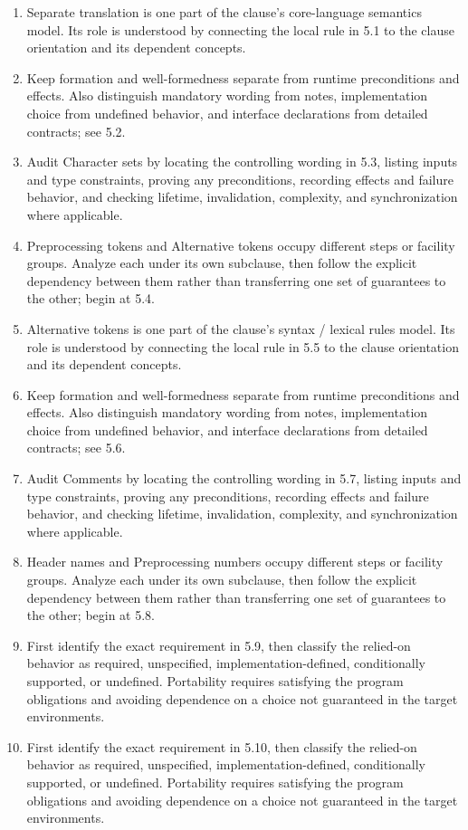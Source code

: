 \documentclass[11pt,letterpaper]{article}
\begin{document}
\begin{enumerate}
\item Separate translation is one part of the clause's core-language semantics model. Its role is understood by connecting the local rule in 5.1 to the clause orientation and its dependent concepts.
\item Keep formation and well-formedness separate from runtime preconditions and effects. Also distinguish mandatory wording from notes, implementation choice from undefined behavior, and interface declarations from detailed contracts; see 5.2.
\item Audit Character sets by locating the controlling wording in 5.3, listing inputs and type constraints, proving any preconditions, recording effects and failure behavior, and checking lifetime, invalidation, complexity, and synchronization where applicable.
\item Preprocessing tokens and Alternative tokens occupy different steps or facility groups. Analyze each under its own subclause, then follow the explicit dependency between them rather than transferring one set of guarantees to the other; begin at 5.4.
\item Alternative tokens is one part of the clause's syntax / lexical rules model. Its role is understood by connecting the local rule in 5.5 to the clause orientation and its dependent concepts.
\item Keep formation and well-formedness separate from runtime preconditions and effects. Also distinguish mandatory wording from notes, implementation choice from undefined behavior, and interface declarations from detailed contracts; see 5.6.
\item Audit Comments by locating the controlling wording in 5.7, listing inputs and type constraints, proving any preconditions, recording effects and failure behavior, and checking lifetime, invalidation, complexity, and synchronization where applicable.
\item Header names and Preprocessing numbers occupy different steps or facility groups. Analyze each under its own subclause, then follow the explicit dependency between them rather than transferring one set of guarantees to the other; begin at 5.8.
\item First identify the exact requirement in 5.9, then classify the relied-on behavior as required, unspecified, implementation-defined, conditionally supported, or undefined. Portability requires satisfying the program obligations and avoiding dependence on a choice not guaranteed in the target environments.
\item First identify the exact requirement in 5.10, then classify the relied-on behavior as required, unspecified, implementation-defined, conditionally supported, or undefined. Portability requires satisfying the program obligations and avoiding dependence on a choice not guaranteed in the target environments.
\end{enumerate}
\end{document}

